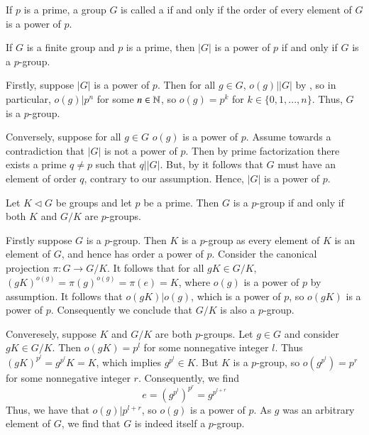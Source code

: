 \documentclass[12pt, a4paper, twoside, openright, titlepage]{book}
\begin{document}
\begin{defn}{}{}
    If $p$ is a prime, a group $G$ is called a  if and only if the order of every element of $G$ is a power of $p$.
\end{defn}

\begin{lem}{}{}
    If $G$ is a finite group and $p$ is a prime, then $|G|$ is a power of $p$ if and only if $G$ is a $p$-group.
\end{lem}
\begin{proof*}{}{}
    Firstly, suppose $|G|$ is a power of $p$. Then for all $g \in G$, $o(g)\vert |G|$ by , so in particular, $o(g)\vert p^n$ for some $n \in \mathbb N$, so $o(g) = p^k$ for $k \in \{0,1,...,n\}$. Thus, $G$ is a $p$-group.

    Conversely, suppose for all $g \in G$ $o(g)$ is a power of $p$. Assume towards a contradiction that $|G|$ is not a power of $p$. Then by prime factorization there exists a prime $q \neq p$ such that $q \vert |G|$. But, by  it follows that $G$ must have an element of order $q$, contrary to our assumption. Hence, $|G|$ is a power of $p$.
\end{proof*}


\begin{thm}{}{}
    Let $K \vartriangleleft G$ be groups and let $p$ be a prime. Then $G$ is a $p$-group if and only if both $K$ and $G/K$ are $p$-groups.
\end{thm}
\begin{proof*}{}{}
    Firstly suppose $G$ is a $p$-group. Then $K$ is a $p$-group as every element of $K$ is an element of $G$, and hence has order a power of $p$. Consider the canonical projection $\pi:G\rightarrow G/K$. It follows that for all $gK \in G/K$, $(gK)^{o(g)} = \pi(g)^{o(g)} = \pi(e) = K$, where $o(g)$ is a power of $p$ by assumption. It follows that $o(gK)\vert o(g)$, which is a power of $p$, so $o(gK)$ is a power of $p$. Consequently we conclude that $G/K$ is also a $p$-group.

    Converesely, suppose $K$ and $G/K$ are both $p$-groups. Let $g \in G$ and consider $gK \in G/K$. Then $o(gK) = p^l$ for some nonnegative integer $l$. Thus $(gK)^{p^l} = g^{p^l}K = K$, which implies $g^{p^l} \in K$. But $K$ is a $p$-group, so $o(g^{p^l}) = p^r$ for some nonnegative integer $r$. Consequently, we find $$e = (g^{p^l})^{p^r} = g^{p^{l+r}}$$
    Thus, we have that $o(g)\vert p^{l+r}$, so $o(g)$ is a power of $p$. As $g$ was an arbitrary element of $G$, we find that $G$ is indeed itself a $p$-group.
\end{proof*}
\end{document}
